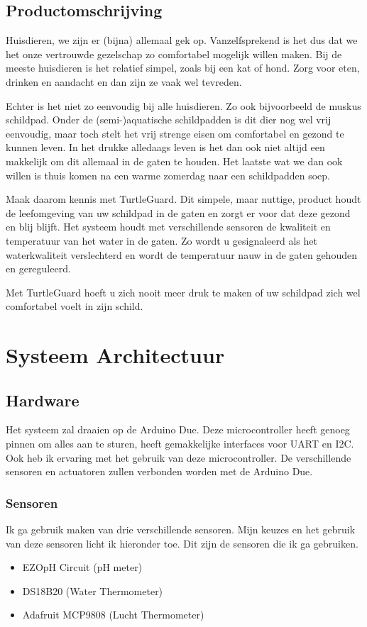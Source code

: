 \documentclass[a4paper]{report}
\newcommand{\turtleguard}{\mbox{TurtleGuard\texttrademark}\xspace}
\begin{document}
\section{Productomschrijving}
\label{section-product}
Huisdieren, we zijn er (bijna) allemaal gek op. Vanzelfsprekend is het dus dat we het onze vertrouwde gezelschap zo comfortabel mogelijk willen maken.
Bij de meeste huisdieren is het relatief simpel, \mbox{zoals} bij een kat of hond. Zorg voor eten, drinken en aandacht en dan zijn ze vaak wel tevreden.
\par \smallskip
Echter is het niet zo eenvoudig bij alle huisdieren. Zo ook bijvoorbeeld de muskus schildpad.
Onder de (semi-)aquatische schildpadden is dit dier nog wel vrij eenvoudig, maar toch stelt het vrij strenge eisen om comfortabel en gezond te kunnen leven.
In het drukke alledaags leven is het dan ook niet altijd een makkelijk om dit allemaal in de gaten te houden.
Het laatste wat we dan ook willen is thuis komen na een warme zomerdag naar een schildpadden soep.
\par \smallskip 
Maak daarom kennis met \turtleguard. Dit simpele, maar nuttige, product houdt de leefomgeving van uw schildpad in de gaten en zorgt er voor dat deze gezond en blij blijft.
Het systeem houdt met verschillende sensoren de kwaliteit en temperatuur van het water in de gaten. 
Zo wordt u gesignaleerd als het waterkwaliteit verslechterd en wordt de temperatuur nauw in de gaten gehouden en gereguleerd.
\par \smallskip 
Met \turtleguard hoeft u zich nooit meer druk te maken of uw schildpad zich wel comfortabel voelt in zijn schild. 

\chapter{Systeem Architectuur}
\section{Hardware}
Het systeem zal draaien op de Arduino Due. Deze microcontroller heeft genoeg pinnen om alles aan te sturen, heeft gemakkelijke interfaces voor UART en I2C. Ook heb ik ervaring met het gebruik van deze microcontroller.
De verschillende sensoren en actuatoren zullen verbonden worden met de Arduino Due. 

\subsection{Sensoren}
Ik ga gebruik maken van drie verschillende sensoren. Mijn keuzes en het gebruik van deze sensoren licht ik hieronder toe.
Dit zijn de sensoren die ik ga gebruiken.
\begin{itemize}
  \item EZO\texttrademark \space pH Circuit (pH meter)
  \item DS18B20 (Water Thermometer)
  \item Adafruit MCP9808 (Lucht Thermometer)
\end{itemize}
\end{document}
